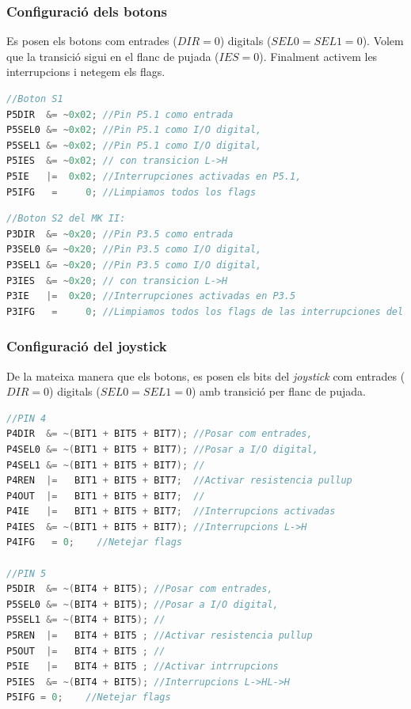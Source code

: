 \documentclass[12pt,a4paper]{article}
\begin{document}
\subsubsection{Configuració dels botons}

Es posen els botons com entrades ($DIR = 0$) digitals ($SEL0 = SEL1 = 0$). Volem que la transició sigui en el flanc de pujada ($IES = 0$). Finalment activem les interrupcions i netegem els flags.

\begin{lstlisting}[language=C]
//Boton S1
P5DIR  &= ~0x02; //Pin P5.1 como entrada
P5SEL0 &= ~0x02; //Pin P5.1 como I/O digital,
P5SEL1 &= ~0x02; //Pin P5.1 como I/O digital,
P5IES  &= ~0x02; // con transicion L->H
P5IE   |=  0x02; //Interrupciones activadas en P5.1,
P5IFG   =     0; //Limpiamos todos los flags
\end{lstlisting}

\begin{lstlisting}[language=C]
//Boton S2 del MK II:
P3DIR  &= ~0x20; //Pin P3.5 como entrada
P3SEL0 &= ~0x20; //Pin P3.5 como I/O digital,
P3SEL1 &= ~0x20; //Pin P3.5 como I/O digital,
P3IES  &= ~0x20; // con transicion L->H
P3IE   |=  0x20; //Interrupciones activadas en P3.5
P3IFG   =     0; //Limpiamos todos los flags de las interrupciones del puerto 3
\end{lstlisting}

\subsubsection{Configuració del joystick}

De la mateixa manera que els botons, es posen els bits del \textit{joystick} com entrades ($DIR = 0$) digitals ($SEL0 = SEL1 = 0$) amb transició per flanc de pujada.
\begin{lstlisting}[language=C]
//PIN 4
P4DIR  &= ~(BIT1 + BIT5 + BIT7); //Posar com entrades,
P4SEL0 &= ~(BIT1 + BIT5 + BIT7); //Posar a I/O digital,
P4SEL1 &= ~(BIT1 + BIT5 + BIT7); //
P4REN  |=   BIT1 + BIT5 + BIT7;  //Activar resistencia pullup
P4OUT  |=   BIT1 + BIT5 + BIT7;  //
P4IE   |=   BIT1 + BIT5 + BIT7;  //Interrupcions activadas
P4IES  &= ~(BIT1 + BIT5 + BIT7); //Interrupcions L->H
P4IFG   = 0;    //Netejar flags

//PIN 5
P5DIR  &= ~(BIT4 + BIT5); //Posar com entrades,
P5SEL0 &= ~(BIT4 + BIT5); //Posar a I/O digital,
P5SEL1 &= ~(BIT4 + BIT5); //
P5REN  |=   BIT4 + BIT5 ; //Activar resistencia pullup
P5OUT  |=   BIT4 + BIT5 ; //
P5IE   |=   BIT4 + BIT5 ; //Activar intrrupcions
P5IES  &= ~(BIT4 + BIT5); //Interrupcions L->HL->H
P5IFG = 0;    //Netejar flags
\end{lstlisting}
\end{document}
